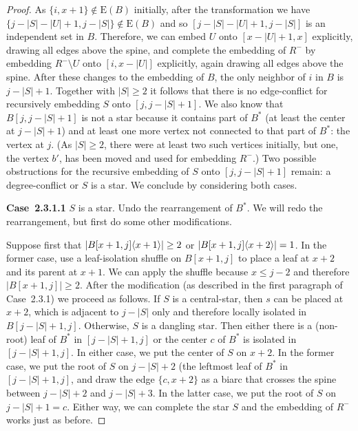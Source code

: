 \documentclass[11pt,a4paper,colorlinks=true,urlcolor=blue,citecolor=red]{article}
\theoremstyle{plain}
\newcommand{\case}[1]{\par\vspace{.5\baselineskip}\noindent\textbf{\sffamily Case~#1}}
\newcommand{\EB}{\mathrm{E}(B)}
\begin{document}
\begin{proof}
  As $\{i,x+1\}\notin\EB$ initially, after the transformation
  we have $\{j-|S|-|U|+1,j-|S|\}\notin\EB$ and so
  $[j-|S|-|U|+1,j-|S|]$ is an independent set in $B$. Therefore, we can
  embed $U$ onto $[x-|U|+1,x]$ explicitly, drawing all edges above the
  spine, and complete the embedding of $R^-$ by embedding $R^-\setminus
  U$ onto $[i,x-|U|]$ explicitly, again drawing all edges above the
  spine. After these changes to the embedding of $B$, the only neighbor
  of $i$ in $B$ is $j-|S|+1$. Together with $|S|\ge 2$ it follows
  that there is no edge-conflict for recursively embedding $S$ onto
  $[j,j-|S|+1]$. We also know that $B[j,j-|S|+1]$ is not a star because
  it contains part of $B^*$ (at least the center at $j-|S|+1$) and at
  least one more vertex not connected to that part of $B^*$: the vertex
  at $j$. (As $|S|\ge 2$, there were at least two such vertices
  initially, but one, the vertex $b'$, has been moved and used for
  embedding $R^-$.) Two possible obstructions for the recursive
  embedding of $S$ onto $[j,j-|S|+1]$ remain: a degree-conflict or $S$
  is a star. We conclude by considering both cases.

  \case{2.3.1.1} $S$ is a star. Undo the rearrangement of $B^*$. We will
  redo the rearrangement, but first do some other modifications.

  Suppose first that $|B{[x+1,j]}\langle{x+1}\rangle|\geq2$ or
  $|B{[x+1,j]}\langle{x+2}\rangle|=1$. In the former case, use a leaf-isolation
  shuffle on $B[x+1,j]$ to place a leaf at $x+2$ and its parent at
  $x+1$. We can apply the shuffle because $x\le j-2$ and therefore
  $|B[x+1,j]|\ge 2$. After the modification (as described in the first
  paragraph of Case~2.3.1) we proceed as follows. If $S$ is a
  central-star, then $s$ can be placed at $x+2$, which is adjacent to
  $j-|S|$ only and therefore locally isolated in $B[j-|S|+1,j]$.
  Otherwise, $S$ is a dangling star. Then either there is a (non-root)
  leaf of $B^*$ in $[j-|S|+1,j]$ or the center $c$ of $B^*$ is isolated
  in $[j-|S|+1,j]$. In either case, we put the center of $S$ on $x+2$.
  In the former case, we put the root of $S$ on $j-|S|+2$ (the leftmost
  leaf of $B^*$ in $[j-|S|+1,j]$, and draw the edge $\{c,x+2\}$ as a
  biarc that crosses the spine between $j-|S|+2$ and $j-|S|+3$. In the
  latter case, we put the root of $S$ on $j-|S|+1=c$. Either way, we can
  complete the star $S$ and the embedding of $R^-$ works just as before.


\end{proof}
\end{document}
